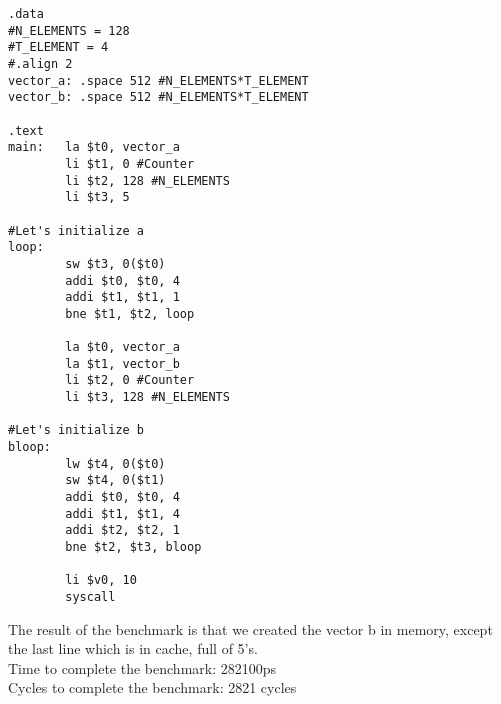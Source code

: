 \documentclass{article}
\begin{document}
\begin{lstlisting} 
.data
#N_ELEMENTS = 128
#T_ELEMENT = 4
#.align 2
vector_a: .space 512 #N_ELEMENTS*T_ELEMENT
vector_b: .space 512 #N_ELEMENTS*T_ELEMENT

.text
main: 	la $t0, vector_a
		li $t1, 0 #Counter
		li $t2, 128 #N_ELEMENTS
		li $t3, 5

#Let's initialize a
loop:	
		sw $t3, 0($t0)
		addi $t0, $t0, 4
		addi $t1, $t1, 1
		bne $t1, $t2, loop

        la $t0, vector_a
		la $t1, vector_b
		li $t2, 0 #Counter
		li $t3, 128 #N_ELEMENTS

#Let's initialize b
bloop:	
		lw $t4, 0($t0)
		sw $t4, 0($t1)
		addi $t0, $t0, 4
		addi $t1, $t1, 4
		addi $t2, $t2, 1
		bne $t2, $t3, bloop

        li $v0, 10
		syscall
\end{lstlisting}
The result of the benchmark is that we created the vector b in memory, except the last line which is in cache, full of 5's.\\
Time to complete the benchmark: 282100ps\\
Cycles to complete the benchmark: 2821 cycles
\end{document}
